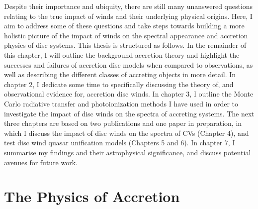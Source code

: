 Despite their importance and ubiquity, there are still
many unanswered questions relating to the true impact of winds and their underlying
physical origins. Here, I aim to address some of these questions and 
take steps towards building a more holistic picture of the impact
of winds on the spectral appearance and accretion physics of disc systems.
This thesis is structured as follows. In the remainder of this chapter, 
I will outline the background accretion theory 
and highlight the successes and failures of accretion 
disc models when compared to observations,
as well as describing the different classes of accreting objects in more detail. 
In chapter 2, I dedicate some time to specifically discussing the theory of,
and observational evidence for, accretion disc winds. In chapter 3, I outline 
the Monte Carlo radiative transfer and photoionization
methods I have used in order to investigate the impact of disc 
winds on the spectra of accreting systems. The next three chapters
are based on two publications and one paper in preparation, 
in which I discuss the impact
of disc winds on the spectra of CVs (Chapter 4), and test disc wind
quasar unification models (Chapters 5 and 6).
In chapter 7, I summarise my findings and their astrophysical significance, 
and discuss potential avenues for future work.


\section{The Physics of Accretion}

